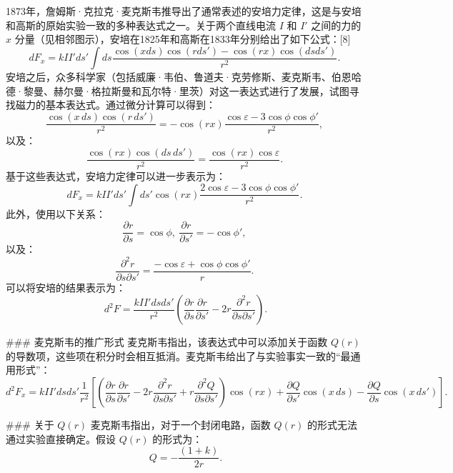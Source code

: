 1873年，詹姆斯·克拉克·麦克斯韦推导出了通常表述的安培力定律，这是与安培和高斯的原始实验一致的多种表达式之一。关于两个直线电流 \(I\) 和 \(I'\) 之间的力的 \(x\) 分量（见相邻图示），安培在1825年和高斯在1833年分别给出了如下公式：[8]
\[
dF_x = kII' ds' \int ds \frac{\cos(x ds) \cos(r ds') - \cos(rx) \cos(ds ds')}{r^2}.~
\]
安培之后，众多科学家（包括威廉·韦伯、鲁道夫·克劳修斯、麦克斯韦、伯恩哈德·黎曼、赫尔曼·格拉斯曼和瓦尔特·里茨）对这一表达式进行了发展，试图寻找磁力的基本表达式。通过微分计算可以得到：
\[
\frac{\cos(x\,ds) \cos(r\,ds')}{r^2} = -\cos(rx) \frac{\cos \varepsilon - 3 \cos \phi \cos \phi'}{r^2},~
\]
以及：
\[
\frac{\cos(rx) \cos(ds\,ds')}{r^2} = \frac{\cos(rx) \cos \varepsilon}{r^2}.~
\]
基于这些表达式，安培力定律可以进一步表示为：
\[
dF_x = kII' ds' \int ds' \cos(rx) \frac{2 \cos \varepsilon - 3 \cos \phi \cos \phi'}{r^2}.~
\]
此外，使用以下关系：
\[
\frac{\partial r}{\partial s} = \cos \phi,\ \frac{\partial r}{\partial s'} = -\cos \phi',~
\]
以及：
\[
\frac{\partial^2 r}{\partial s \partial s'} = \frac{-\cos \varepsilon + \cos \phi \cos \phi'}{r}.~
\]
可以将安培的结果表示为：
\[
d^2F = \frac{kII' ds ds'}{r^2} \left( \frac{\partial r}{\partial s} \frac{\partial r}{\partial s'} - 2r \frac{\partial^2 r}{\partial s \partial s'} \right).
\]

### 麦克斯韦的推广形式
麦克斯韦指出，该表达式中可以添加关于函数 \(Q(r)\) 的导数项，这些项在积分时会相互抵消。麦克斯韦给出了与实验事实一致的“最通用形式”：
\[
d^2F_x = kII' ds ds' \frac{1}{r^2} \left[ \left( \frac{\partial r}{\partial s} \frac{\partial r}{\partial s'} - 2r \frac{\partial^2 r}{\partial s \partial s'} + r \frac{\partial^2 Q}{\partial s \partial s'} \right) \cos(rx) + \frac{\partial Q}{\partial s'} \cos(x\,ds) - \frac{\partial Q}{\partial s} \cos(x\,ds') \right].
\]

### 关于 \(Q(r)\)
麦克斯韦指出，对于一个封闭电路，函数 \(Q(r)\) 的形式无法通过实验直接确定。假设 \(Q(r)\) 的形式为：
\[
Q = -\frac{(1+k)}{2r}.
\]